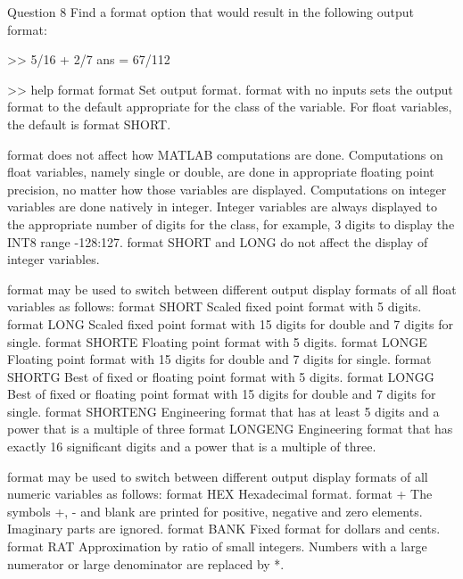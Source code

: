 \begin{statebox}{Question 8}{}
    Find a format option that would result in the following output format:
    \begin{matlab}{}
>> 5/16 + 2/7
ans =
    67/112
    \end{matlab}
\end{statebox}
\begin{matlab}{}
>> help format
 format Set output format.
    format with no inputs sets the output format to the default appropriate
    for the class of the variable. For float variables, the default is
    format SHORT.
 
    format does not affect how MATLAB computations are done. Computations
    on float variables, namely single or double, are done in appropriate
    floating point precision, no matter how those variables are displayed. 
    Computations on integer variables are done natively in integer. Integer
    variables are always displayed to the appropriate number of digits for
    the class, for example, 3 digits to display the INT8 range -128:127.
    format SHORT and LONG do not affect the display of integer variables.
 
    format may be used to switch between different output display formats
    of all float variables as follows:
      format SHORT     Scaled fixed point format with 5 digits.
      format LONG      Scaled fixed point format with 15 digits for double
                       and 7 digits for single.
      format SHORTE    Floating point format with 5 digits.
      format LONGE     Floating point format with 15 digits for double and
                       7 digits for single.
      format SHORTG    Best of fixed or floating point format with 5 
                       digits.
      format LONGG     Best of fixed or floating point format with 15 
                       digits for double and 7 digits for single.
      format SHORTENG  Engineering format that has at least 5 digits
                       and a power that is a multiple of three
      format LONGENG   Engineering format that has exactly 16 significant
                       digits and a power that is a multiple of three.
 
    format may be used to switch between different output display formats
    of all numeric variables as follows:
      format HEX     Hexadecimal format.
      format +       The symbols +, - and blank are printed 
                     for positive, negative and zero elements.
                     Imaginary parts are ignored.
      format BANK    Fixed format for dollars and cents.
      format RAT     Approximation by ratio of small integers.  Numbers
                     with a large numerator or large denominator are
                     replaced by *.
 

\end{matlab}
